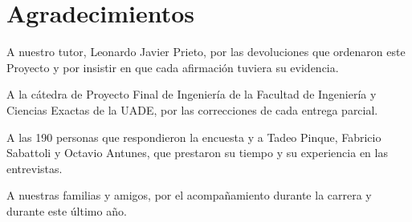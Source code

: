 \chapter*{Agradecimientos}

A nuestro tutor, Leonardo Javier Prieto, por las devoluciones que ordenaron este Proyecto y por insistir en que cada afirmación tuviera su evidencia.

A la cátedra de Proyecto Final de Ingeniería de la Facultad de Ingeniería y Ciencias Exactas de la UADE, por las correcciones de cada entrega parcial.

A las 190 personas que respondieron la encuesta y a Tadeo Pinque, Fabricio Sabattoli y Octavio Antunes, que prestaron su tiempo y su experiencia en las entrevistas.

A nuestras familias y amigos, por el acompañamiento durante la carrera y durante este último año.
